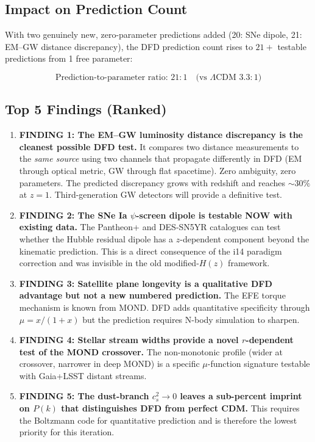 \documentclass[11pt]{article}
\newcommand{\LCDM}{$\Lambda$CDM}
\begin{document}
\subsection{Impact on Prediction Count}

With two genuinely new, zero-parameter predictions added (20: SNe dipole,
21: EM--GW distance discrepancy), the DFD prediction count rises to
$21+$ testable predictions from 1 free parameter:

\begin{equation}
\boxed{
\text{Prediction-to-parameter ratio: } 21:1
\quad\text{(vs \LCDM\ } 3.3:1\text{)}
}
\end{equation}

\subsection{Top 5 Findings (Ranked)}

\begin{enumerate}
\item \textbf{FINDING 1: The EM--GW luminosity distance discrepancy is the
cleanest possible DFD test.}  It compares two distance measurements to the
\emph{same source} using two channels that propagate differently in DFD
(EM through optical metric, GW through flat spacetime).  Zero ambiguity,
zero parameters.  The predicted discrepancy grows with redshift and reaches
$\sim 30\%$ at $z = 1$.  Third-generation GW detectors will provide a
definitive test.

\item \textbf{FINDING 2: The SNe Ia $\psi$-screen dipole is testable NOW
with existing data.}  The Pantheon+ and DES-SN5YR catalogues can test
whether the Hubble residual dipole has a $z$-dependent component beyond
the kinematic prediction.  This is a direct consequence of the i14
paradigm correction and was invisible in the old modified-$H(z)$ framework.

\item \textbf{FINDING 3: Satellite plane longevity is a qualitative
DFD advantage but not a new numbered prediction.}  The EFE torque
mechanism is known from MOND.  DFD adds quantitative specificity through
$\mu = x/(1+x)$ but the prediction requires N-body simulation to sharpen.

\item \textbf{FINDING 4: Stellar stream widths provide a novel $r$-dependent
test of the MOND crossover.}  The non-monotonic profile (wider at crossover,
narrower in deep MOND) is a specific $\mu$-function signature testable with
Gaia+LSST distant streams.

\item \textbf{FINDING 5: The dust-branch $c_s^2 \to 0$ leaves a sub-percent
imprint on $P(k)$ that distinguishes DFD from perfect CDM.}  This requires
the Boltzmann code for quantitative prediction and is therefore the lowest
priority for this iteration.
\end{enumerate}
\end{document}
